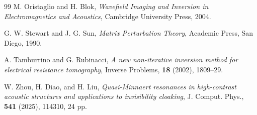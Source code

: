 \documentclass[11pt,reqno,twoside]{amsart}
\theoremstyle{definition}
\theoremstyle{remark}
\numberwithin{equation}{section}
\begin{document}
\begin{thebibliography}{99}
M. Oristaglio and H. Blok, {\it Wavefield Imaging and Inversion in Electromagnetics and Acoustics}, Cambridge University Press, 2004.

G. W. Stewart and J. G. Sun, {\it Matrix Perturbation Theory}, Academic Press, San Diego, 1990.
 
A. Tamburrino and G. Rubinacci, {\it A new non-iterative inversion method for electrical resistance tomography}, Inverse Problems, \textbf{18} (2002), 1809–29.

W. Zhou, H. Diao, and H. Liu, {\it Quasi-Minnaert resonances in high-contrast acoustic structures and applications to invisibility cloaking}, J. Comput. Phys., \textbf{541} (2025), 114310, 24 pp.

\end{thebibliography}
\end{document}
